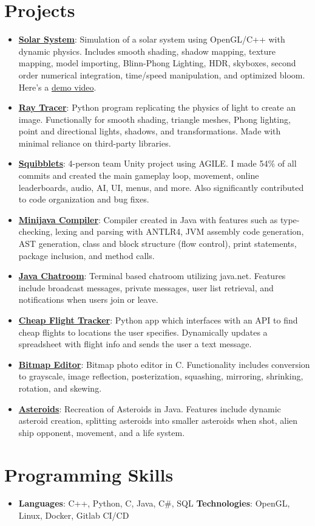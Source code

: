 \documentclass[letterpaper,11pt]{article}
\newcommand{\resumeItem}[2]{
  \item\small{
    \textbf{#1}{: #2 \vspace{-2pt}}
  }
}
\newcommand{\resumeSubItem}[2]{\resumeItem{#1}{#2}\vspace{-4pt}}
\newcommand{\resumeSubHeadingListStart}{\begin{itemize}[leftmargin=*]}
\newcommand{\resumeSubHeadingListEnd}{\end{itemize}}
\begin{document}
\section{Projects}
  \resumeSubHeadingListStart
    \resumeSubItem{\href{https://github.com/Nathan-Hutton/solar-system}{Solar System}}
      {Simulation of a solar system using OpenGL/C++ with dynamic physics. Includes smooth
shading, shadow mapping, texture mapping, model importing, Blinn-Phong Lighting, HDR, skyboxes, second order numerical integration, time/speed manipulation, and optimized bloom. Here's a \href{https://nathan-hutton.github.io/Portfolio/images/finalVideo.mp4}{demo video}.}
    \resumeSubItem{\href{https://github.com/Nathan-Hutton/Ray-Tracer}{Ray Tracer}}
      {Python program replicating the physics of light to create an image. Functionally for smooth
shading, triangle meshes, Phong lighting, point and directional lights, shadows, and transformations. Made with minimal reliance on third-party libraries.}
    \resumeSubItem{\href{https://github.com/CharlesBirdgv/Squibblets}{Squibblets}}
      {4-person team Unity project using AGILE. I made 54\% of all commits and created the main
gameplay loop, movement, online leaderboards, audio, AI, UI, menus, and more. Also significantly
contributed to code organization and bug fixes.}
    \resumeSubItem{\href{https://github.com/Nathan-Hutton/Minijava_Compiler_AST}{Minijava Compiler}}
    {Compiler created in Java with features such as type-checking, lexing and parsing
with ANTLR4, JVM assembly code generation, AST generation, class and block structure (flow control),
print statements, package inclusion, and method calls.}
    \resumeSubItem{\href{https://github.com/Nathan-Hutton/Chatroom}{Java Chatroom}}
    {Terminal based chatroom utilizing java.net. Features include broadcast messages, private messages, user list retrieval, and notifications when users join or leave.}
    \resumeSubItem{\href{https://github.com/Nathan-Hutton/Flight-Finder}{Cheap Flight Tracker}}
    {Python app which interfaces with an API to find cheap flights to locations the user
specifies. Dynamically updates a spreadsheet with flight info and sends the user a text message.}
    \resumeSubItem{\href{https://github.com/Nathan-Hutton/Bitmap-Editor}{Bitmap Editor}}
    {Bitmap photo editor in C. Functionality includes conversion to grayscale, image reflection, posterization, squashing, mirroring, shrinking, rotation, and skewing.}
    \resumeSubItem{\href{https://github.com/Nathan-Hutton/Asteroids}{Asteroids}}
    {Recreation of Asteroids in Java. Features include dynamic asteroid creation, splitting asteroids into smaller asteroids when shot, alien ship opponent, movement, and a life system.}
  \resumeSubHeadingListEnd

%
\section{Programming Skills}
 \resumeSubHeadingListStart
   \item{
     \textbf{Languages}{: C++, Python, C, Java, C\#, SQL}
     \hfill
     \textbf{Technologies}{: OpenGL, Linux, Docker, Gitlab CI/CD}
   }
 \resumeSubHeadingListEnd


\end{document}
